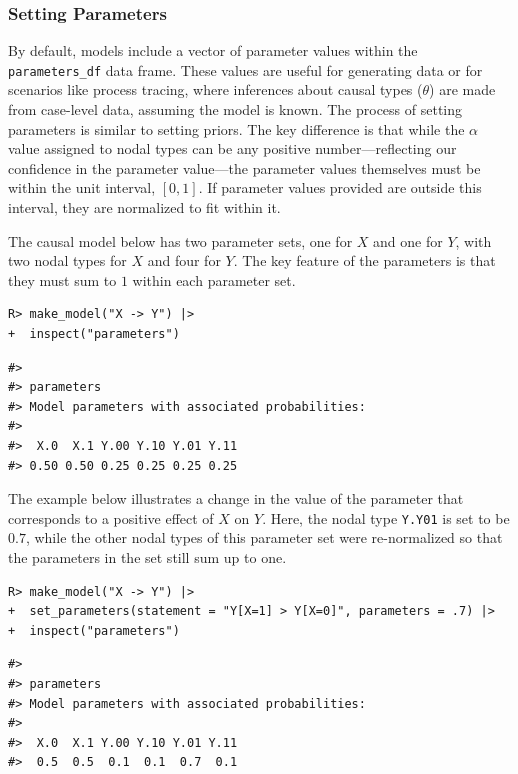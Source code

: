 \documentclass[
  11pt,
  article]{jss}
\begin{document}
\subsubsection{Setting Parameters}\label{parameters}

By default, models include a vector of parameter values within the
\texttt{parameters\_df} data frame. These values are useful for
generating data or for scenarios like process tracing, where inferences
about causal types (\(\theta\)) are made from case-level data, assuming
the model is known. The process of setting parameters is similar to
setting priors. The key difference is that while the \(\alpha\) value
assigned to nodal types can be any positive number---reflecting our
confidence in the parameter value---the parameter values themselves must
be within the unit interval, \([0,1]\). If parameter values provided are
outside this interval, they are normalized to fit within it.

The causal model below has two parameter sets, one for \(X\) and one for
\(Y\), with two nodal types for \(X\) and four for \(Y\). The key
feature of the parameters is that they must sum to \(1\) within each
parameter set.

\begin{verbatim}
R> make_model("X -> Y") |> 
+  inspect("parameters")
\end{verbatim}

\begin{verbatim}
#> 
#> parameters
#> Model parameters with associated probabilities: 
#> 
#>  X.0  X.1 Y.00 Y.10 Y.01 Y.11 
#> 0.50 0.50 0.25 0.25 0.25 0.25
\end{verbatim}

The example below illustrates a change in the value of the parameter
that corresponds to a positive effect of \(X\) on \(Y\). Here, the nodal
type \texttt{Y.Y01} is set to be \(0.7\), while the other nodal types of
this parameter set were re-normalized so that the parameters in the set
still sum up to one.

\begin{verbatim}
R> make_model("X -> Y") |>
+  set_parameters(statement = "Y[X=1] > Y[X=0]", parameters = .7) |>
+  inspect("parameters")
\end{verbatim}

\begin{verbatim}
#> 
#> parameters
#> Model parameters with associated probabilities: 
#> 
#>  X.0  X.1 Y.00 Y.10 Y.01 Y.11 
#>  0.5  0.5  0.1  0.1  0.7  0.1
\end{verbatim}
\end{document}
